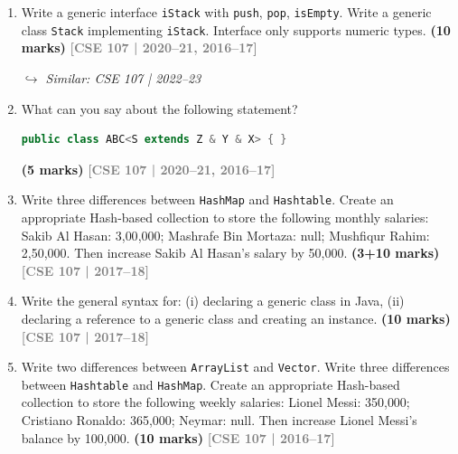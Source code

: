 \documentclass[12pt,a3paper]{article}
\newcommand{\yr}[1]{\hfill\textcolor{gray}{\small\textbf{[#1]}}}
\newcommand{\mk}[1]{\textcolor{orange!70!black}{\small\textbf{(#1 marks)}}}
\newcommand{\variant}[1]{\par\vspace{1pt}\textcolor{blue!50!black}%
  {\footnotesize\textit{$\hookrightarrow$ Similar: #1}}}
\begin{document}
\begin{enumerate}




\item Write a generic interface \texttt{iStack} with \texttt{push}, \texttt{pop}, \texttt{isEmpty}. Write a generic class \texttt{Stack} implementing \texttt{iStack}. Interface only supports numeric types. \mk{10}
\yr{CSE 107 | 2020--21, 2016--17}
\variant{CSE 107 | 2022--23}






\item What can you say about the following statement?
\begin{lstlisting}[language=Java]
public class ABC<S extends Z & Y & X> { }
\end{lstlisting}
\mk{5}
\yr{CSE 107 | 2020--21, 2016--17}




\item Write three differences between \texttt{HashMap} and \texttt{Hashtable}. Create an appropriate Hash-based collection to store the following monthly salaries: Sakib Al Hasan: 3{,}00{,}000; Mashrafe Bin Mortaza: null; Mushfiqur Rahim: 2{,}50{,}000. Then increase Sakib Al Hasan's salary by 50{,}000. \mk{3+10}
\yr{CSE 107 | 2017--18}






\item Write the general syntax for: (i) declaring a generic class in Java, (ii) declaring a reference to a generic class and creating an instance. \mk{10}
\yr{CSE 107 | 2017--18}




\item Write two differences between \texttt{ArrayList} and \texttt{Vector}. Write three differences between \texttt{Hashtable} and \texttt{HashMap}. Create an appropriate Hash-based collection to store the following weekly salaries: Lionel Messi: 350{,}000; Cristiano Ronaldo: 365{,}000; Neymar: null. Then increase Lionel Messi's balance by 100{,}000. \mk{10}
\yr{CSE 107 | 2016--17}


\end{enumerate}
\end{document}
